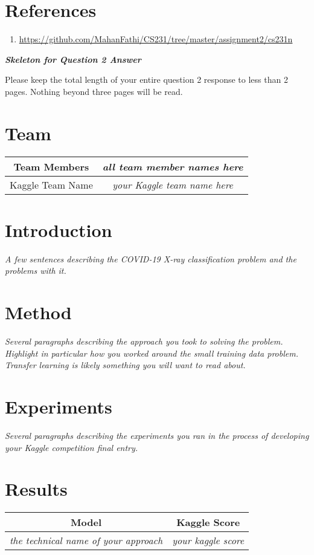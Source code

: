 \documentclass{article}
\def\enum#1{\begin{enumerate}#1\end{enumerate}}
\begin{document}
\section{References}
\enum{
\item \url{https://github.com/MahanFathi/CS231/tree/master/assignment2/cs231n}
}

\newpage

{\em \bf Skeleton for Question 2 Answer}
\setcounter{section}{0}

Please keep the total length of your entire question 2 response to less than 2 pages.  Nothing beyond three pages will be read. 
\section{Team}
\begin{tabular}{|c | c } 
\hline
Team Members & \emph{all team member names here} \\
\hline
Kaggle Team Name & \emph{your Kaggle team name here}\\
\hline
\end{tabular}
\section{Introduction}
\emph{A few sentences describing the COVID-19 X-ray classification problem and the problems with it.}
\section{Method}
\emph{Several paragraphs describing the approach you took to solving the problem.  Highlight in particular how you worked around the small training
data problem.  Transfer learning is likely something you will want to read
about.}
\section{Experiments}
\emph{Several paragraphs describing the experiments you ran in the process of developing your Kaggle competition final entry.}
\section{Results}

\begin{center}
 \begin{tabular}{|c | c |} 
 \hline
 Model & Kaggle Score  \\ [0.5ex]
 \hline\hline
 \emph{the technical name of your approach} & \emph{your kaggle score} \\
 \hline
\end{tabular}
\end{center}
\end{document}
